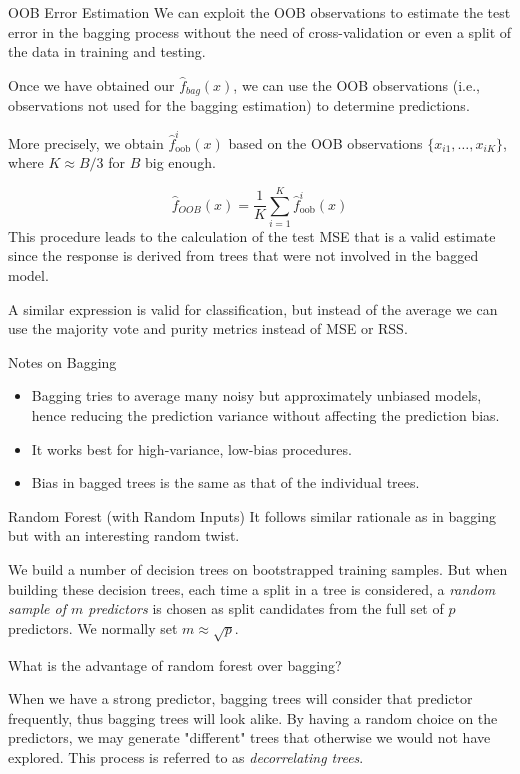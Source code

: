 \documentclass{beamer}
\begin{document}
\begin{frame}{OOB Error Estimation}
	We can exploit the OOB observations to estimate the test error in the bagging process without the need of cross-validation or even a split of the data in training and testing.
	
	Once we have obtained our $\hat{f}_{bag}(x)$, we can use the OOB observations (i.e., observations not used for the bagging estimation) to determine predictions. 
	
	More precisely, we obtain $\hat{f}_{\textrm{oob}}^i (x)$ based on the OOB observations $\{x_{i1},\ldots, x_{iK}\}$, where $K \approx B/3$ for $B$ big enough. 
		
		
	
	
	\begin{equation*}
		\hat{f}_{OOB}(x)= \frac{1}{K}\sum_{i=1}^{K} \hat{f}^{i}_{\textrm{oob}}(x)
	\end{equation*}
This procedure leads to the calculation of the test MSE that is a valid estimate since the response is derived from trees that were not involved in the bagged model.

A similar expression is valid for classification, but instead of the average we can use the majority vote and purity metrics instead of MSE or RSS. 
\end{frame}

\begin{frame}{Notes on Bagging}
	\begin{itemize}
		\item Bagging tries to average many noisy but approximately unbiased models, hence reducing the prediction variance without affecting the prediction bias. 
		\item It works best for high-variance, low-bias procedures.
		\item Bias in bagged trees is the same as that of the individual trees.
	\end{itemize}
\end{frame}


\begin{frame}{Random Forest (with Random Inputs)}
	It follows similar rationale as in bagging but with an interesting random twist.
	
	We build a number of decision trees on bootstrapped training samples. But when building these decision trees, each time a split in a tree is considered, a {\it random sample of $m$ predictors} is chosen as split candidates from the full set of $p$ predictors.  We normally set $m\approx \sqrt{p}$.
	
	What is the advantage of random forest over bagging?
	
	When we have a strong predictor, bagging trees will consider that predictor frequently, thus bagging trees will look alike. By having a random choice on the predictors, we may generate "different" trees that otherwise we would not have explored. This process is referred to as {\it decorrelating trees}. 

\end{frame}
\end{document}
